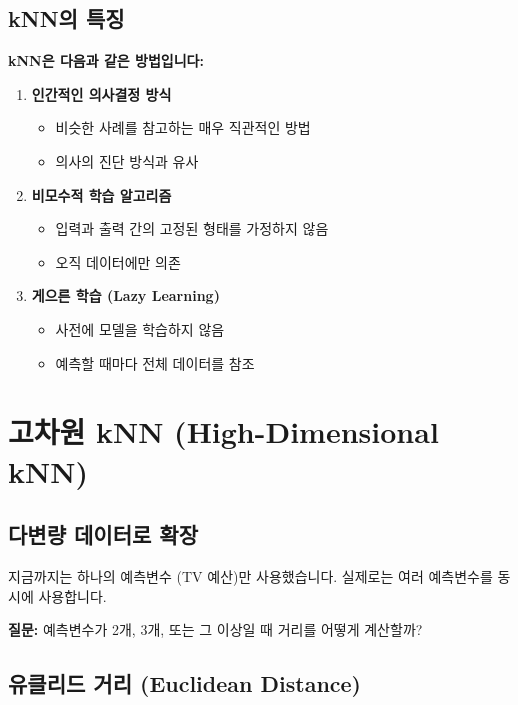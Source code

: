 \documentclass[12pt,a4paper]{article}
\begin{document}
\subsection{kNN의 특징}

\textbf{kNN은 다음과 같은 방법입니다:}

\begin{enumerate}
    \item \textbf{인간적인 의사결정 방식}
    \begin{itemize}
        \item 비슷한 사례를 참고하는 매우 직관적인 방법
        \item 의사의 진단 방식과 유사
    \end{itemize}

    \item \textbf{비모수적 학습 알고리즘}
    \begin{itemize}
        \item 입력과 출력 간의 고정된 형태를 가정하지 않음
        \item 오직 데이터에만 의존
    \end{itemize}

    \item \textbf{게으른 학습 (Lazy Learning)}
    \begin{itemize}
        \item 사전에 모델을 학습하지 않음
        \item 예측할 때마다 전체 데이터를 참조
    \end{itemize}
\end{enumerate}

\section{고차원 kNN (High-Dimensional kNN)}

\subsection{다변량 데이터로 확장}

지금까지는 하나의 예측변수 (TV 예산)만 사용했습니다.
실제로는 여러 예측변수를 동시에 사용합니다.

\textbf{질문:} 예측변수가 2개, 3개, 또는 그 이상일 때 거리를 어떻게 계산할까?

\subsection{유클리드 거리 (Euclidean Distance)}
\end{document}
